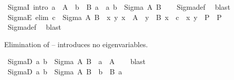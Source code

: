 \begin{isabellebody}
\isanewline
{}\isamarkupfalse%
\ SigmaI\ {\isacharbrackleft}{\kern0pt}intro{\isacharbang}{\kern0pt}{\isacharbrackright}{\kern0pt}{\isacharcolon}{\kern0pt}\ {\isachardoublequoteopen}a\ {\isasymin}\ A\ {\isasymLongrightarrow}\ b\ {\isasymin}\ B\ a\ {\isasymLongrightarrow}\ {\isacharparenleft}{\kern0pt}a{\isacharcomma}{\kern0pt}\ b{\isacharparenright}{\kern0pt}\ {\isasymin}\ Sigma\ A\ B{\isachardoublequoteclose}\isanewline
%
\isadelimproof
\ \ %
\endisadelimproof
%
\isatagproof
{}\isamarkupfalse%
\ Sigma{\isacharunderscore}{\kern0pt}def\ \isamarkupfalse%
\ blast%
\endisatagproof
{\isafoldproof}%
%
\isadelimproof
\isanewline
%
\endisadelimproof
\isanewline
{}\isamarkupfalse%
\ SigmaE\ {\isacharbrackleft}{\kern0pt}elim{\isacharbang}{\kern0pt}{\isacharbrackright}{\kern0pt}{\isacharcolon}{\kern0pt}\ {\isachardoublequoteopen}c\ {\isasymin}\ Sigma\ A\ B\ {\isasymLongrightarrow}\ {\isacharparenleft}{\kern0pt}{\isasymAnd}x\ y{\isachardot}{\kern0pt}\ x\ {\isasymin}\ A\ {\isasymLongrightarrow}\ y\ {\isasymin}\ B\ x\ {\isasymLongrightarrow}\ c\ {\isacharequal}{\kern0pt}\ {\isacharparenleft}{\kern0pt}x{\isacharcomma}{\kern0pt}\ y{\isacharparenright}{\kern0pt}\ {\isasymLongrightarrow}\ P{\isacharparenright}{\kern0pt}\ {\isasymLongrightarrow}\ P{\isachardoublequoteclose}\isanewline
\ \ %
\isanewline
%
\isadelimproof
\ \ %
\endisadelimproof
%
\isatagproof
{}\isamarkupfalse%
\ Sigma{\isacharunderscore}{\kern0pt}def\ \isamarkupfalse%
\ blast%
\endisatagproof
{\isafoldproof}%
%
\isadelimproof
%
\endisadelimproof
%
\begin{isamarkuptext}%
Elimination of  -- introduces no
  eigenvariables.%
\end{isamarkuptext}\isamarkuptrue%
\isamarkupfalse%
\ SigmaD{}{\isacharcolon}{\kern0pt}\ {\isachardoublequoteopen}{\isacharparenleft}{\kern0pt}a{\isacharcomma}{\kern0pt}\ b{\isacharparenright}{\kern0pt}\ {\isasymin}\ Sigma\ A\ B\ {\isasymLongrightarrow}\ a\ {\isasymin}\ A{\isachardoublequoteclose}\isanewline
%
\isadelimproof
\ \ %
\endisadelimproof
%
\isatagproof
{}\isamarkupfalse%
\ blast%
\endisatagproof
{\isafoldproof}%
%
\isadelimproof
\isanewline
%
\endisadelimproof
\isanewline
{}\isamarkupfalse%
\ SigmaD{}{\isacharcolon}{\kern0pt}\ {\isachardoublequoteopen}{\isacharparenleft}{\kern0pt}a{\isacharcomma}{\kern0pt}\ b{\isacharparenright}{\kern0pt}\ {\isasymin}\ Sigma\ A\ B\ {\isasymLongrightarrow}\ b\ {\isasymin}\ B\ a{\isachardoublequoteclose}\isanewline

\end{isabellebody}
